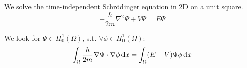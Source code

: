 \documentclass[a4paper,11pt]{scrartcl}
\newcommand*{\dx}{\dif{}x}
\begin{document}
We solve the time-independent Schrödinger equation in 2D on a unit square.
\[ -\frac{\hbar}{2m} \nabla^2 \Psi + V \Psi = E \Psi\]

We look for $\Psi \in H^1_0(\Omega)$, s.t. $\forall \phi \in H^1_0(\Omega)$:
\[ \int_{\Omega} \frac{\hbar}{2m} \nabla \Psi \cdot \nabla\phi \dx =
  \int_{\Omega} (E - V) \Psi \phi\dx\]
\end{document}
